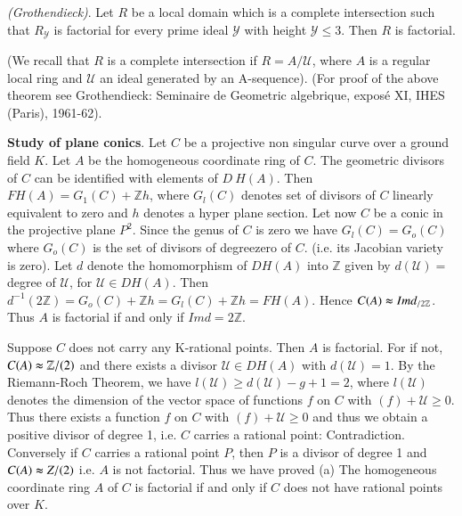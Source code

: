 \begin{theorem*}
{\em (Grothendieck)}. 
 Let $R$ be a local domain which is a complete intersection
   such that $R_{\mathscr{Y}}$ is factorial for every prime ideal
   $\mathscr{Y}$ with height $\mathscr{Y} \le 3$. Then $R$ is
   factorial. 
\end{theorem*}

\noindent
(We recall that $R$ is a complete intersection if $R =
A / \mathscr{U}$, where $A$ is a regular local ring and
$\mathscr{U}$ an ideal generated by an A-sequence). 
(For proof of the above theorem see Grothendieck: Seminaire de
Geometric algebrique, expos\'e XI,  IHES (Paris), 1961-62). 

\medskip
\noindent
\textbf{Study of plane conics}. Let $C$ be a projective non singular
curve over a ground field $K$. Let $A$ be the homogeneous coordinate
ring of $C$. The geometric divisors of $C$ can be identified with
elements of $D ~ H (A)$. Then $F H(A) = G_1 (C) + \mathbb{Z}h$, where
$G_l (C)$ denotes set of divisors of $C$ linearly equivalent to zero
and $h$ denotes a hyper plane section. Let now $C$ be a conic in the
projective plane $P^2$. Since the genus of  $C$ is zero we have $G_l
(C) = G_o (C)$ where $G_o (C)$ is the set of divisors of
degree\pageoriginale zero 
of $C$. (i.e. its Jacobian variety is zero). Let $d$ denote the
homomorphism of $D H (A)$ into $\mathbb{Z}$ given by $d (\mathscr{U})=
$ degree of $\mathscr{U}$, for $\mathscr{U} \in D H(A)$. Then $d^{-1}
(2 \mathbb{Z}) = G_o (C) + \mathbb{Z} h = G_l (C) + \mathbb{Z}h = F H
(A)$. Hence $C(A) \thickapprox I md _{/ 2 \mathbb{Z}}$. Thus $A$ is
factorial if and only if $I md= 2 \mathbb{Z}$. 

Suppose $C$ does not carry any K-rational points. Then $A$ is
factorial. For if not, $C(A) \thickapprox {\mathbb{Z}}/(2)$ and
there exists a divisor $\mathscr{U} \in D H(A)$ with $d (\mathscr{U})
= 1$. By the Riemann-Roch Theorem, we have $l(\mathscr{U}) \ge
d(\mathscr{U}) - g + 1=2$, where $l(\mathscr{U})$ denotes the
dimension of the vector space of functions $f$ on $C$ with $(f) +
\mathscr{U} \ge 0$. Thus there exists a function $f$ on $C$ with $(f)
+ \mathscr{U} \ge 0$ and thus we obtain a positive divisor of degree
1, i.e. $C$ carries a rational point: Contradiction. Conversely if
$C$ carries a rational point $P$, then $P$ is a divisor of degree 1
and $C(A) \thickapprox {Z}/(2)$ i.e. $A$ is not factorial. Thus we
have proved (a) The homogeneous coordinate ring $A$ of $C$ is
factorial if and only if $C$ does not have rational points over $K$. 
  

